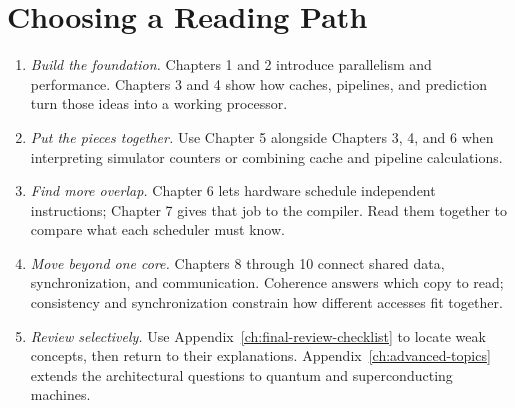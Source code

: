 \section*{Choosing a Reading Path}\label{sec:cross-chapter-reading-paths}
\begin{enumerate}
    \item \textit{Build the foundation.} Chapters 1 and 2 introduce parallelism and performance. Chapters 3 and 4 show how caches, pipelines, and prediction turn those ideas into a working processor.
    \item \textit{Put the pieces together.} Use Chapter 5 alongside Chapters 3, 4, and 6 when interpreting simulator counters or combining cache and pipeline calculations.
    \item \textit{Find more overlap.} Chapter 6 lets hardware schedule independent instructions; Chapter 7 gives that job to the compiler. Read them together to compare what each scheduler must know.
    \item \textit{Move beyond one core.} Chapters 8 through 10 connect shared data, synchronization, and communication. Coherence answers which copy to read; consistency and synchronization constrain how different accesses fit together.
    \item \textit{Review selectively.} Use Appendix~\ref{ch:final-review-checklist} to locate weak concepts, then return to their explanations. Appendix~\ref{ch:advanced-topics} extends the architectural questions to quantum and superconducting machines.
\end{enumerate}
